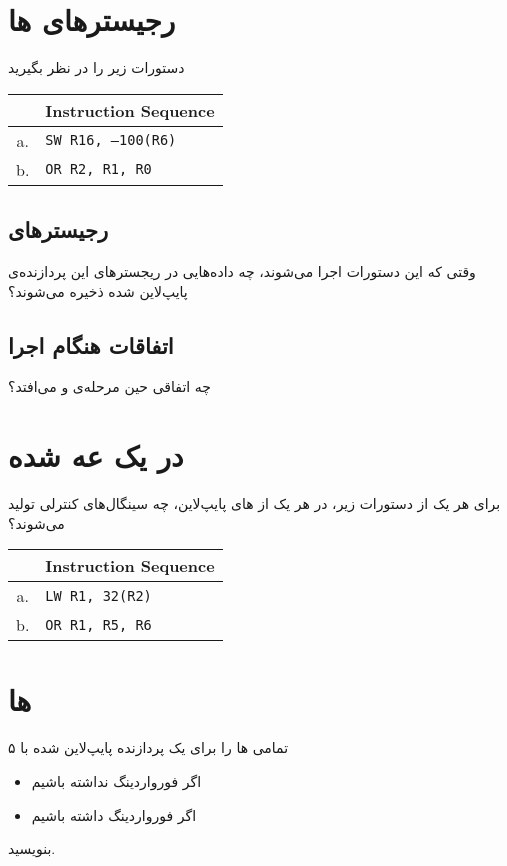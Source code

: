 \documentclass[11pt, dvipsnames, svgnames, x11names]{article}
\begin{document}
\section{رجیستر‌های ها}
دستورات زیر را در نظر بگیرید
\begin{latin}
\begin{table}[H]
\begin{center}
\begin{tabular}{|c|l|}
\hline
& Instruction Sequence \\
\hline
a. &
\texttt{SW R16, –100(R6)} \\
\hline
b. &
\texttt{OR R2, R1, R0} \\ 
\hline
\end{tabular}
\end{center}
\end{table}
\end{latin}
\subsection{رجیستر‌های }
وقتی که این دستورات اجرا می‌شوند، چه داده‌هایی در ریجستر‌های این پردازنده‌ی پایپ‌لاین شده ذخیره می‌شوند؟

\subsection{اتفاقات هنگام اجرا}
چه اتفاقی حین مرحله‌ی  و  می‌افتد؟


\section{ در یک  عه  شده}
برای هر یک از دستورات زیر، در هر یک از های پایپ‌لاین، چه سینگال‌های کنترلی تولید می‌شوند؟
\begin{latin}
\begin{table}[H]
\begin{center}
\begin{tabular}{|c|l|}
\hline
& Instruction Sequence \\
\hline
a. &
\texttt{LW R1, 32(R2)} \\
\hline
b. &
\texttt{OR R1, R5, R6} \\ 
\hline
\end{tabular}
\end{center}
\end{table}
\end{latin}

\section{ها}
تمامی ها را برای یک پردازنده‌ پایپ‌لاین شده با ۵  
\begin{itemize}
\item 
اگر فورواردینگ نداشته باشیم
\item 
اگر فورواردینگ داشته باشیم
\end{itemize}
بنویسید.
\end{document}
